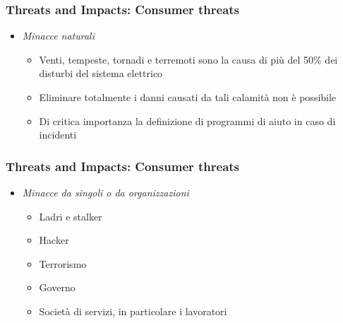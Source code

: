 \begin{frame}
  \frametitle{Threats and Impacts: Consumer threats}
  \begin{itemize}[<+- | alert@+>]
  \item \textit{Minacce naturali}
	\begin{itemize}
	\item Venti, tempeste, tornadi e terremoti sono la causa di più del 50\% dei disturbi del sistema elettrico
	\item Eliminare totalmente i danni causati da tali calamità non è possibile
	\item Di critica importanza la definizione di programmi di aiuto in caso di incidenti
	\end{itemize}
  \end{itemize}
\end{frame}

\begin{frame}
  \frametitle{Threats and Impacts: Consumer threats}
  \begin{itemize}[<+- | alert@+>]
  \item \textit{Minacce da singoli o da organizzazioni}
	\begin{itemize}
	\item Ladri e stalker
	\item Hacker
	\item Terrorismo
	\item Governo
	\item Società di servizi, in particolare i lavoratori
	\end{itemize}
  \end{itemize}
\end{frame}

